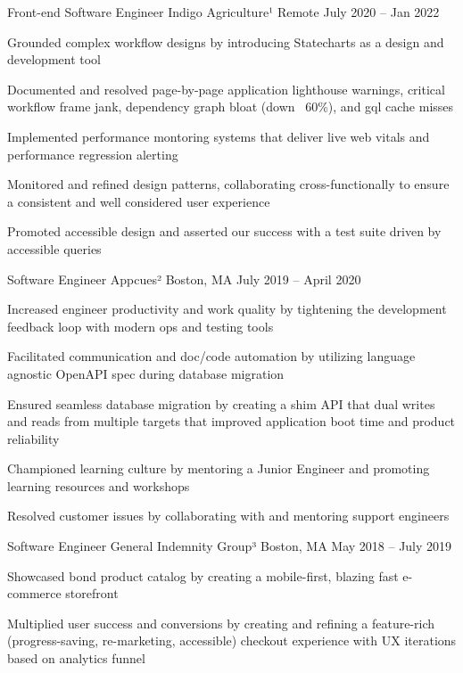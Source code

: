 \documentclass[]{awesome-cv}
\begin{document}
\begin{cventries}
	\cventry
	{Front-end Software Engineer}
	{Indigo Agriculture¹}
	{Remote}
	{July 2020 – Jan 2022}
	{\begin{cvitems}
		\item {Grounded complex workflow designs by introducing Statecharts as a design and development tool}
		\item {Documented and resolved page-by-page application lighthouse warnings, critical workflow frame jank, dependency graph bloat (down ~60\%), and gql cache misses}
		\item {Implemented performance montoring systems that deliver live web vitals and performance regression alerting}
		\item {Monitored and refined design patterns, collaborating cross-functionally to ensure a consistent and well considered user experience}
		\item {Promoted accessible design and asserted our success with a test suite driven by accessible queries}
		\end{cvitems}}	
	\cventry
	{Software Engineer}
	{Appcues²}
	{Boston, MA}
	{July 2019 – April 2020}
	{\begin{cvitems}
		\item {Increased engineer productivity and work quality by tightening the development feedback loop with modern ops and testing tools}
		\item {Facilitated communication and doc/code automation by utilizing language agnostic OpenAPI spec during database migration}
		\item {Ensured seamless database migration by creating a shim API that dual writes and reads from multiple targets that improved application boot time and product reliability}
		\item {Championed learning culture by mentoring a Junior Engineer and promoting learning resources and workshops}
		\item {Resolved customer issues by collaborating with and mentoring support engineers}
		\end{cvitems}}
	\cventry
	{Software Engineer}
	{General Indemnity Group³}
	{Boston, MA}
	{May 2018 – July 2019}
	{\begin{cvitems}
		\item {Showcased bond product catalog by creating a mobile-first, blazing fast e-commerce storefront}
		\item {Multiplied user success and conversions by creating and refining a feature-rich (progress-saving, re-marketing, accessible) checkout experience with UX iterations based on analytics funnel}

\end{cvitems}}
\end{cventries}
\end{document}
